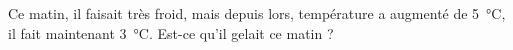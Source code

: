 
\begin{exercice}\label{exo2smath-0059}

    Ce matin, il faisait très froid, mais depuis lors, température a augmenté de \SI{5}{\celsius}, il fait maintenant \SI{3}{\celsius}. Est-ce qu'il gelait ce matin ?

\end{exercice}

